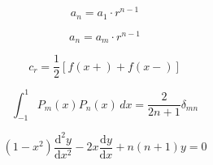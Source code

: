 \[\begin{equation} \label{Geometric Formula with a1} a_{n}=a_{1}\cdot r^{n-1} \end{equation}\]

\[\begin{equation} \label{Geometric Formula with n&m} a_{n}=a_{m}\cdot r^{n-1} \end{equation}\]

\[\begin{equation} c_r = \frac{1}{2}[f(x+) + f(x-)] \end{equation}\]

\[\begin{equation} \int _{-1}^{1}P_{m}(x)P_{n}(x)\,dx={\frac{2}{2n+1}}\delta _{mn} \end{equation}\]

\[\begin{equation} \label{legendiffeq} (1-x^{2})\frac{\mathrm{d}^2y}{\mathrm{d}x^2} - 2x\frac{\mathrm{d}y}{\mathrm{d}x} + n(n+1)y = 0 \end{equation}\]

